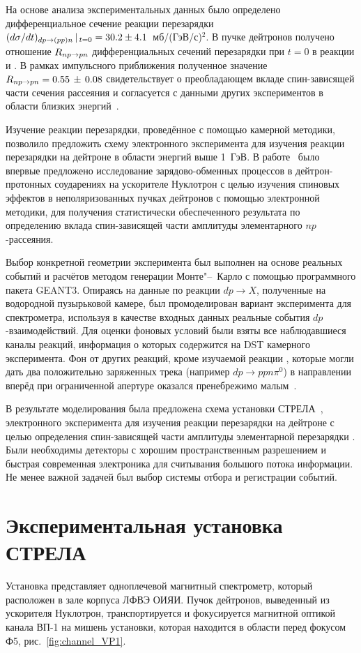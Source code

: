 На основе анализа экспериментальных данных было определено дифференциальное
сечение реакции перезарядки
$(d\sigma/dt)_{dp \rightarrow (pp)n}\,|\,_{t=0} = 30.2 \pm 4.1$~мб/(ГэВ/с)$^{2}$.
В пучке дейтронов получено отношение $R_{np \rightarrow pn}$ дифференциальных сечений
перезарядки при $t=0$ в реакции \dpchex и \np. В рамках импульсного приближения
полученное значение $R_{np \rightarrow pn} = 0.55\,\pm\,0.08$ свидетельствует о преобладающем
вкладе спин-зависящей части сечения \np рассеяния и согласуется с данными других
экспериментов в области близких энергий~\cite{mucha02,gla_mucha08}.

Изучение реакции перезарядки, проведённое с помощью камерной методики, позволило
предложить схему электронного эксперимента для изучения реакции перезарядки на
дейтроне в области энергий выше 1~ГэВ. В работе~\cite{glagolev96} было впервые
предложено исследование зарядово-обменных процессов в дейтрон-протонных
соударениях на ускорителе Нуклотрон с целью изучения спиновых эффектов в
неполяризованных пучках дейтронов с помощью электронной методики, для получения
статистически обеспеченного результата по определению вклада спин-зависящей
части амплитуды элементарного $np$-рассеяния.

Выбор конкретной геометрии эксперимента был выполнен на основе реальных событий
и расчётов методом генерации Монте"--~Карло с помощью программного пакета
GEANT3. Опираясь на данные по реакции $dp \rightarrow X$, полученные на
водородной пузырьковой камере, был промоделирован вариант эксперимента для
спектрометра, используя в качестве входных данных реальные события
$dp$-взаимодействий.  Для оценки фоновых условий были взяты все наблюдавшиеся
каналы реакций, информация о которых содержится на DST камерного
эксперимента. Фон от других реакций, кроме изучаемой реакции \dpfrag, которые
могли дать два положительно заряженных трека (например $dp \rightarrow
ppn\pi^{0}$) в направлении вперёд при ограниченной апертуре оказался
пренебрежимо малым~\cite{baz99}.

В результате моделирования была предложена схема установки
СТРЕЛА~\cite{strela_web}, электронного эксперимента для изучения реакции
перезарядки на дейтроне \dpchex с целью определения спин-зависящей части
амплитуды элементарной перезарядки \np. Были необходимы детекторы с хорошим
пространственным разрешением и быстрая современная электроника для считывания
большого потока информации. Не менее важной задачей был выбор системы отбора и
регистрации событий.

\section{Экспериментальная установка СТРЕЛА}
Установка представляет одноплечевой магнитный спектрометр, который расположен в
зале корпуса  ЛФВЭ ОИЯИ. Пучок дейтронов, выведенный из ускорителя
Нуклотрон, транспортируется и фокусируется магнитной оптикой канала ВП-1 на
мишень установки, которая находится в области перед фокусом Ф5,
рис.~\ref{fig:channel_VP1}.

